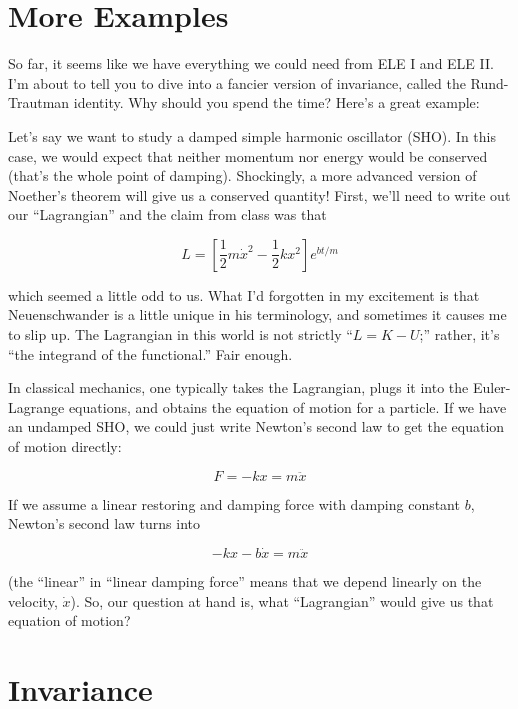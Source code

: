 \documentclass[12pt]{article}
\newcommand{\coord}{x}
\newcommand{\xd}{\dot{\coord}}
\newcommand{\xdd}{\ddot{\coord}}
\numberwithin{equation}{section}
\begin{document}
\pagebreak
\section{More Examples}
So far, it seems like we have everything we could need from ELE I and
ELE II. I'm about to tell you to dive into a fancier version of
invariance, called the Rund-Trautman identity. Why should you spend
the time? Here's a great example:

Let's say we want to study a damped simple harmonic oscillator
(SHO). In this case, we would expect that neither momentum nor energy
would be conserved (that's the whole point of damping). Shockingly, a
more advanced version of Noether's theorem will give us a conserved
quantity! First, we'll need to write out our ``Lagrangian'' and the
claim from class was that

\begin{equation}
  L = \left[\frac{1}{2}m\xd^2 - \frac{1}{2}k\coord^2\right]e^{bt/m}
\end{equation}

\noindent which seemed a little odd to us. What I'd forgotten in my
excitement is that Neuenschwander is a little unique in his
terminology, and sometimes it causes me to slip up. The Lagrangian in
this world is not strictly ``$L=K-U$;'' rather, it's ``the integrand
of the functional.'' Fair enough. 

In classical mechanics, one typically takes the Lagrangian, plugs it
into the Euler-Lagrange equations, and obtains the equation of motion
for a particle.  If we have an undamped SHO, we could just write
Newton's second law to get the equation of motion directly:

\begin{equation}
  F = -k\coord = m\xdd
\end{equation}

If we assume a linear restoring and damping force with damping
constant $b$, Newton's second law turns into

\begin{equation}
  -k\coord - b\xd = m \xdd
\end{equation}

\noindent (the ``linear'' in ``linear damping force'' means that we
depend linearly on the velocity, $\xd$). So, our question at hand is,
what ``Lagrangian'' would give us that equation of motion?

\section{Invariance}
\end{document}
